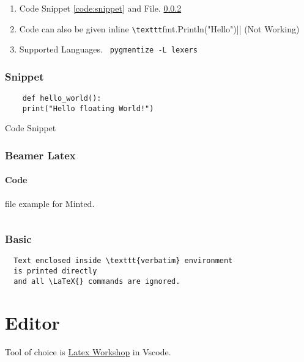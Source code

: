 \documentclass{report}[a4paper,12pt] %
\begin{document}
\begin{enumerate}
  \item Code Snippet \ref{code:snippet} and File. \ref{code:file}
  \item Code can also be given inline \verb|\texttt|fmt.Println("Hello")|| (Not Working)
  \item Supported Languages. \verb| pygmentize -L lexers|
\end{enumerate}

\subsubsection{Snippet}
\begin{listing}[h]
  \begin{verbatim}
    def hello_world():
    print("Hello floating World!")
  \end{verbatim}
  \caption{Code Snippet}
  \label{code:snippet}
\end{listing}

\subsubsection{Beamer Latex}
\label{code:file}
\paragraph{Code} file example for Minted.
\inputminted{tex}{../../presentation/beamer/tutorial.tex} 

\subsubsection{Basic}
\begin{verbatim}
  Text enclosed inside \texttt{verbatim} environment 
  is printed directly 
  and all \LaTeX{} commands are ignored.
\end{verbatim}

\section{Editor}
Tool of choice is \href{https://github.com/James-Yu/LaTeX-Workshop}{Latex Workshop} in Vscode.
\end{document}
